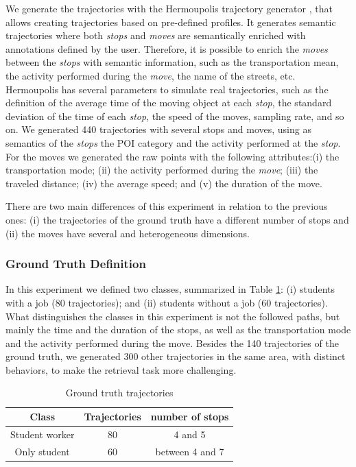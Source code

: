 {We generate the trajectories with the  Hermoupolis trajectory generator} \cite{Pelekis-Hermoupolis}{, that allows creating trajectories based on pre-defined profiles. It generates semantic trajectories where both \emph{stops} and \emph{moves} are semantically enriched with annotations defined by the user. Therefore, it is possible to enrich the \emph{moves} between the \emph{stops} with semantic information, such as the transportation mean, the activity performed during the \emph{move}, the name of the streets, etc. Hermoupolis has several parameters to simulate real trajectories, such as the definition of the average time of the moving object at each \emph{stop}, the standard deviation of the time of each \emph{stop}, the speed of the moves, sampling rate, and so on. We generated 440 trajectories with several stops and moves, using as semantics of the \emph{stops} the POI category and the activity performed at the \emph{stop}. For the moves we generated the raw points with the following attributes:(i) the transportation mode; (ii) the activity performed during the \emph{move}; (iii) the traveled distance; (iv) the average speed; and (v) the duration of the move.}

{There are two main differences of this experiment in relation to the previous ones: (i) the trajectories of the ground truth have a different number of stops and (ii) the moves have several and heterogeneous dimensions.}

\subsubsection{Ground Truth Definition}
{In this experiment we defined two classes, summarized in Table {\ref{tab:hermoupolis_dataset}}: (i) students with a job (80 trajectories); and (ii) students without a job (60 trajectories). What distinguishes the classes in this experiment is not the followed paths, but mainly the time and the duration  of the stops, as well as the transportation mode and the activity performed during the move. Besides the 140 trajectories of the ground truth, we generated 300 other trajectories in the same area, with distinct behaviors, to make the retrieval task more challenging.}

\begin{table}[ht!]
\scriptsize
  \centering
  \begin{tabular}{|c|c|c|}
  \hline
  Class & Trajectories & number of stops \\
  \hline
Student worker & 80 & 4 and 5 \\
Only student & 60 & between 4 and 7 \\
    \hline
  \end{tabular}
  \caption{Ground truth trajectories}
  \label{tab:hermoupolis_dataset}
\end{table}

